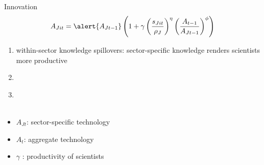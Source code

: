 \documentclass[11pt,aspectratio=169]{beamer}
\begin{document}


\begin{frame}{Innovation}
	\pause
	\vspace{-5mm}
	\large
	\begin{align*}
		A_{Jit}=\alert{A_{Jt-1}}\left(1+\gamma\left(\frac{s_{Jit}}{\rho_J}\right)^\eta\left(\frac{A_{t-1}}{A_{Jt-1}}\right)^\phi\right)
	\end{align*}
	\normalsize
	\begin{enumerate}
		\item \alert{within-sector knowledge spillovers: sector-specific knowledge renders scientists more productive} %
		\item[] \  %
		\item[] \ \\ \ %
	\end{enumerate}
	\small
	\vspace{4mm}
	\hspace{-2mm}
	\begin{minipage}[t!]{0.43\textwidth}
		\vspace{0mm}
		\begin{itemize}
			\item[] $A_{Jt}$: sector-specific technology
			\vspace{-2mm}		
			\item[] $A_t$: aggregate technology
			\vspace{-2mm}
			\item[] $\gamma$ : productivity of scientists

\end{itemize}
\end{minipage}
\end{frame}
\end{document}
